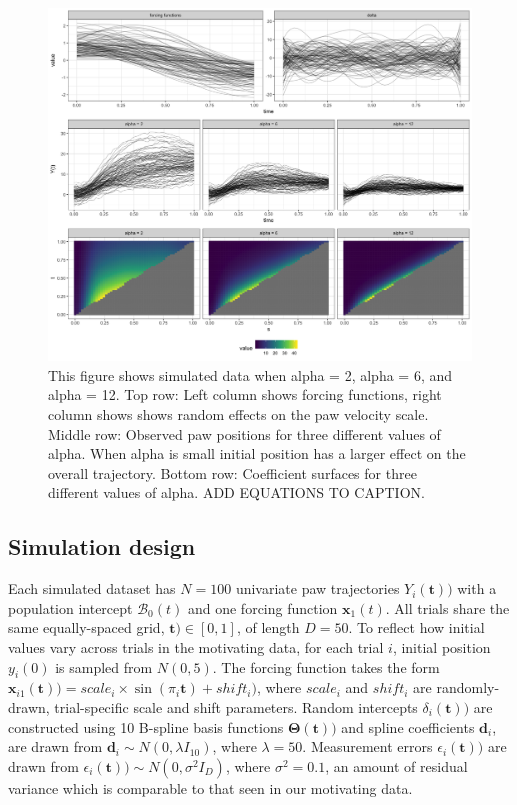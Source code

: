 \documentclass[preprint]{JASA}
\begin{document}
\begin{figure}
\includegraphics[width=\reprintcolumnwidth]{figs/fig_simdata_RE-1} \caption{This figure shows simulated data when alpha = 2, alpha = 6, and alpha = 12. Top row: Left column shows forcing functions, right column shows shows random effects on the paw velocity scale. Middle row: Observed paw positions for three different values of alpha. When alpha is small initial position has a larger effect on the overall trajectory.  Bottom row: Coefficient surfaces for three different values of alpha.  ADD EQUATIONS TO CAPTION.}\label{fig:sim_data}
\end{figure}

\hypertarget{simulation-design}{%
\subsection{Simulation design}\label{simulation-design}}

Each simulated dataset has \(N = 100\) univariate paw trajectories
\(Y_i(\mathbf{t}))\) with a population intercept \(\mathcal{B}_0(t)\)
and one forcing function \(\mathbf{x}_1(t)\). All trials share the same
equally-spaced grid, \(\mathbf{t}) \in [0, 1]\), of length \(D = 50\).
To reflect how initial values vary across trials in the motivating data,
for each trial \(i\), initial position \(y_i(0)\) is sampled from
\(N(0, 5)\). The forcing function takes the form
\(\mathbf{x}_{i1}(\mathbf{t})) = scale_i \times \sin(\pi_i \mathbf{t}) + shift_i)\),
where \(scale_i\) and \(shift_i\) are randomly-drawn, trial-specific
scale and shift parameters. Random intercepts \(\delta_i(\mathbf{t}))\)
are constructed using 10 B-spline basis functions
\(\mathbf{\Theta}(\mathbf{t}))\) and spline coefficients
\(\mathbf{d}_i\), are drawn from
\(\mathbf{d}_i \sim N(0, \lambda I_{10})\), where \(\lambda = 50\).
Measurement errors \(\epsilon_i(\mathbf{t}))\) are drawn from
\(\epsilon_i(\mathbf{t})) \sim N(0, \sigma^2 I_{D})\), where
\(\sigma^2 = 0.1\), an amount of residual variance which is comparable
to that seen in our motivating data.
\end{document}
